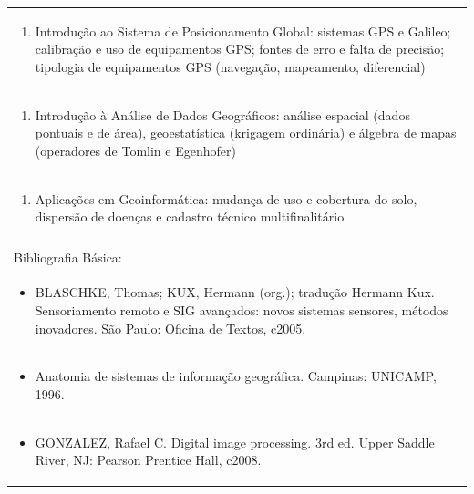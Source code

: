 \documentclass[11pt]{article}
\begin{document}
\begin{center}
\begin{longtable}{|p{4cm}|p{4cm}|p{4cm}|p{4cm}|}
\multicolumn{4}{|p{\dimexpr 16cm + 6\tabcolsep\relax}|}{\begin{enumerate}[start=7]\item Introdução ao Sistema de Posicionamento Global: sistemas GPS e Galileo; calibração e uso de equipamentos GPS; fontes de erro e falta de precisão; tipologia de equipamentos GPS (navegação, mapeamento, diferencial)\end{enumerate}}\\
\multicolumn{4}{|p{\dimexpr 16cm + 6\tabcolsep\relax}|}{\begin{enumerate}[start=8]\item Introdução à Análise de Dados Geográficos: análise espacial (dados pontuais e de área), geoestatística (krigagem ordinária) e álgebra de mapas (operadores de Tomlin e Egenhofer)\end{enumerate}}\\
\multicolumn{4}{|p{\dimexpr 16cm + 6\tabcolsep\relax}|}{\begin{enumerate}[start=9]\item Aplicações em Geoinformática: mudança de uso e cobertura do solo, dispersão de doenças e cadastro técnico multifinalitário\end{enumerate}}\\
\multicolumn{4}{|p{\dimexpr 16cm + 6\tabcolsep\relax}|}{}\\
\hline
\multicolumn{4}{|p{16cm}|}{Bibliografia Básica:}\\*
\multicolumn{4}{|p{\dimexpr 16cm + 6\tabcolsep\relax}|}{\begin{itemize}\item BLASCHKE, Thomas; KUX, Hermann (org.); tradução Hermann Kux. Sensoriamento remoto e SIG avançados: novos sistemas sensores, métodos inovadores. São Paulo: Oficina de Textos, c2005.\end{itemize}}\\
\multicolumn{4}{|p{\dimexpr 16cm + 6\tabcolsep\relax}|}{\begin{itemize}\item Anatomia de sistemas de informação geográfica. Campinas: UNICAMP, 1996.\end{itemize}}\\
\multicolumn{4}{|p{\dimexpr 16cm + 6\tabcolsep\relax}|}{\begin{itemize}\item GONZALEZ, Rafael C. Digital image processing. 3rd ed. Upper Saddle River, NJ: Pearson Prentice Hall, c2008.\end{itemize}}\\

\end{longtable}
\end{center}
\end{document}
